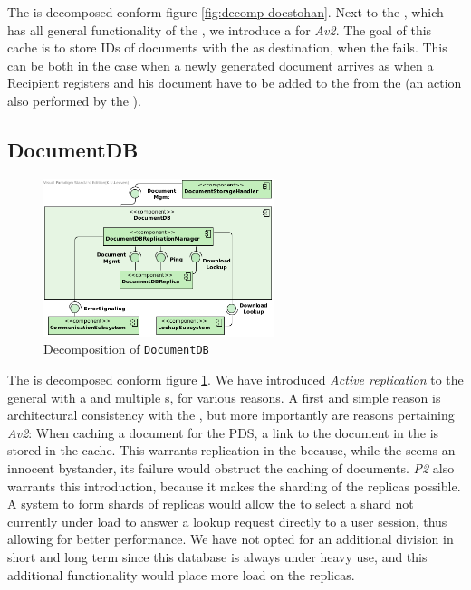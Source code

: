 The  is decomposed conform figure \ref{fig:decomp-docstohan}. Next to the , which has all general functionality of the , we introduce a  for \emph{Av2}. The goal of this cache is to store IDs of documents with the  as destination, when the  fails. This can be both in the case when a newly generated document arrives as when a Recipient registers and his document have to be added to the  from the  (an action also performed by the ).

\subsection{DocumentDB}
\begin{figure}[!htp]
    \centering
    \includegraphics[width=0.6\textwidth]{figures/DocumentDB.png}
    \caption{Decomposition of \texttt{DocumentDB}}\label{fig:decomp-docdb}
\end{figure}

The  is decomposed conform figure \ref{fig:decomp-docdb}. We have introduced \emph{Active replication} to the general  with a  and multiple s, for various reasons. A first and simple reason is architectural consistency with the , but more importantly are reasons pertaining \emph{Av2}: When caching a document for the PDS, a link to the document in the  is stored in the cache. This warrants replication in the  because, while the  seems an innocent bystander, its failure would obstruct the caching of documents. \emph{P2} also warrants this introduction, because it makes the sharding of the replicas possible. A system to form shards of replicas would allow the  to select a shard not currently under load to answer a lookup request directly to a user session, thus allowing for better performance. We have not opted for an additional division in short and long term since this database is always under heavy use, and this additional functionality would place more load on the replicas.


